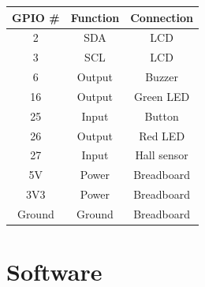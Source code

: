 \documentclass{article}
\begin{document}
\begin{center}
    \begin{tabular}{ |c|c|c| } 
        \hline
        GPIO \# & Function & Connection \\
        \hline
        2 & SDA & LCD \\
        3 & SCL & LCD \\
        6 & Output & Buzzer \\
        16 & Output & Green LED \\
        25 & Input & Button \\
        26 & Output & Red LED \\
        27 & Input & Hall sensor \\
        5V & Power & Breadboard \\
        3V3 & Power & Breadboard \\
        Ground & Ground & Breadboard \\
        \hline
    \end{tabular}
\end{center}

\section{Software}
\end{document}
